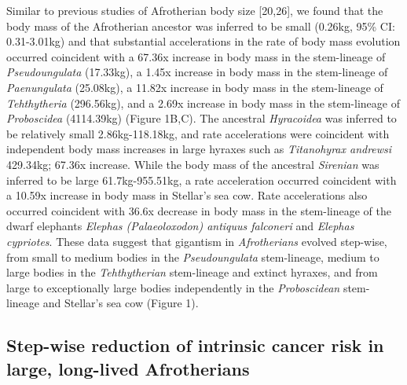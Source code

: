 \documentclass[]{elsarticle} %
\begin{document}
Similar to previous studies of Afrotherian body size {[}20,26{]}, we
found that the body mass of the Afrotherian ancestor was inferred to be
small (0.26kg, 95\% CI: 0.31-3.01kg) and that substantial accelerations
in the rate of body mass evolution occurred coincident with a 67.36x
increase in body mass in the stem-lineage of \emph{Pseudoungulata}
(17.33kg), a 1.45x increase in body mass in the stem-lineage of
\emph{Paenungulata} (25.08kg), a 11.82x increase in body mass in the
stem-lineage of \emph{Tehthytheria} (296.56kg), and a 2.69x increase in
body mass in the stem-lineage of \emph{Proboscidea} (4114.39kg) (Figure
1B,C). The ancestral \emph{Hyracoidea} was inferred to be relatively
small 2.86kg-118.18kg, and rate accelerations were coincident with
independent body mass increases in large hyraxes such as
\emph{Titanohyrax andrewsi} 429.34kg; 67.36x increase. While the body
mass of the ancestral \emph{Sirenian} was inferred to be large
61.7kg-955.51kg, a rate acceleration occurred coincident with a 10.59x
increase in body mass in Stellar's sea cow. Rate accelerations also
occurred coincident with 36.6x decrease in body mass in the stem-lineage
of the dwarf elephants \emph{Elephas (Palaeoloxodon) antiquus falconeri}
and \emph{Elephas cypriotes}. These data suggest that gigantism in
\emph{Afrotherians} evolved step-wise, from small to medium bodies in
the \emph{Pseudoungulata} stem-lineage, medium to large bodies in the
\emph{Tehthytherian} stem-lineage and extinct hyraxes, and from large to
exceptionally large bodies independently in the \emph{Proboscidean}
stem-lineage and Stellar's sea cow (Figure 1).

\hypertarget{step-wise-reduction-of-intrinsic-cancer-risk-in-large-long-lived-afrotherians}{%
\subsection{Step-wise reduction of intrinsic cancer risk in large,
long-lived
Afrotherians}\label{step-wise-reduction-of-intrinsic-cancer-risk-in-large-long-lived-afrotherians}}
\end{document}
